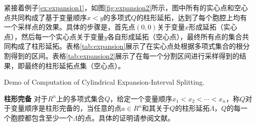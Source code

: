 \begin{example}
紧接着例子\ref{ex:expansion1}，如图\ref{fig:expansion2}所示，图中所有的实心点和空心点共同构成了基于变量顺序$x < y$的多项式$Q$的柱形延拓，达到了每个胞腔上均有一个采样点的效果。具体的步骤是，首先点$(0, 0)$关于变量$x$形成延拓（实心点），然后每一个实心点关于变量$y$各自形成延拓（空心点），最终所有点的集合共同构成了柱形延拓。表格\ref{tab:expansion}展示了在实心点处根据多项式集合的根分割得到的区间。表格\ref{tab:expansion2}展示了在每一个分割区间进行采样得到的结果，即最终的柱形延拓点集（空心点）。

\begin{table}[]
    \centering
         {Demo of Computation of Cylindrical Expansion-Interval Splitting.}
\label{tab:expansion}
\end{table}
\end{example}

\begin{definition}{\textbf{柱形完备}}
对于$R^n$上的多项式集合$Q$，给定一个变量顺序$x_1 < x_2 < \cdots < x_n$，称$Q$对于变量顺序是柱形完备的，当任意的点$a \in R^n$和其关于$Q$的柱形延拓$\Lambda$，$Q$的每一个胞腔都包含至少一个$\Lambda$的点。具体的证明请参阅文献\cite{Caviness2004QuantifierEA,Collins74}。
\end{definition}

